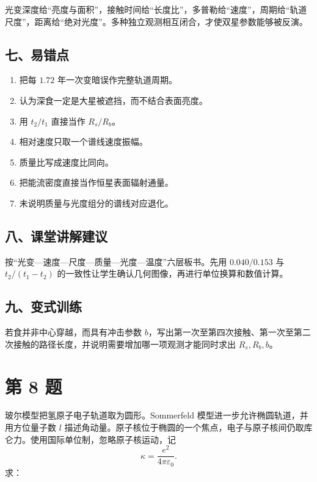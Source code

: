 \documentclass[12pt,a4paper,UTF8]{ctexart}
\newcommand{\tightlist}{\setlength{\itemsep}{0pt}\setlength{\parskip}{0pt}}
\begin{document}
光变深度给``亮度与面积''，接触时间给``长度比''，多普勒给``速度''，周期给``轨道尺度''，距离给``绝对光度''。多种独立观测相互闭合，才使双星参数能够被反演。

\subsection{七、易错点}\label{ux4e03ux6613ux9519ux70b9-6}

\begin{enumerate}
\def\labelenumi{\arabic{enumi}.}
\tightlist
\item
  把每 \(1.72\) 年一次变暗误作完整轨道周期。
\item
  认为深食一定是大星被遮挡，而不结合表面亮度。
\item
  用 \(t_2/t_1\) 直接当作 \(R_s/R_b\)。
\item
  相对速度只取一个谱线速度振幅。
\item
  质量比写成速度比同向。
\item
  把能流密度直接当作恒星表面辐射通量。
\item
  未说明质量与光度组分的谱线对应退化。
\end{enumerate}

\subsection{八、课堂讲解建议}\label{ux516bux8bfeux5802ux8bb2ux89e3ux5efaux8bae-6}

按``光变---速度---尺度---质量---光度---温度''六层板书。先用
\(0.040/0.153\) 与 \(t_2/(t_1-t_2)\)
的一致性让学生确认几何图像，再进行单位换算和数值计算。

\subsection{九、变式训练}\label{ux4e5dux53d8ux5f0fux8badux7ec3-6}

若食并非中心穿越，而具有冲击参数
\(b\)，写出第一次至第四次接触、第一次至第二次接触的路径长度，并说明需要增加哪一项观测才能同时求出
\(R_s,R_b,b\)。

\newpage

\section{第 8 题}\label{ux7b2c-8-ux9898}

玻尔模型把氢原子电子轨道取为圆形。Sommerfeld
模型进一步允许椭圆轨道，并用方位量子数 \(l\)
描述角动量。原子核位于椭圆的一个焦点，电子与原子核间仍取库仑力。使用国际单位制，忽略原子核运动，记
\[
\kappa=\frac{e^2}{4\pi\varepsilon_0}.
\] 求：
\end{document}
